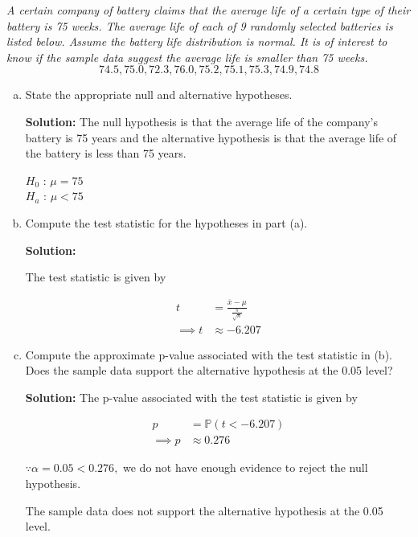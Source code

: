 \documentclass[12pt,letterpaper]{article}
\begin{document}
\textit{A certain company of battery claims that the average life of a certain type of their battery is 75 weeks. The average life of each of 9 randomly selected batteries is listed below. Assume the battery life distribution is normal. It is of interest to know if the sample data suggest the average life is smaller than 75 weeks.}
$$74.5, 75.0, 72.3, 76.0, 75.2, 75.1, 75.3, 74.9, 74.8$$

\begin{enumerate}[a.] \setlength{\itemsep}{30pt}
  \item State the appropriate null and alternative hypotheses.
  
  \textbf{Solution:}
  The null hypothesis is that the average life of the company's battery is 75 years and the alternative hypothesis is that the average life of the battery is less than 75 years.
  
  $H_0$ : $\mu = 75$\\
  $H_a$ : $\mu < 75$

  \item Compute the test statistic for the hypotheses in part (a).

  \textbf{Solution:}

  The test statistic is given by

  \begin{equation}
    \begin{split}
      t &= \frac{\overline{x} - \mu}{\frac{s}{\sqrt{n}}}\\
      \implies t &\approx -6.207
    \end{split}
  \end{equation}
  \item Compute the approximate p-value associated with the test statistic in (b). Does the sample data support the alternative hypothesis at the 0.05 level?

  \textbf{Solution:}
  The p-value associated with the test statistic is given by

  \begin{equation}
    \begin{split}
      p &= \mathbb{P}(t < -6.207)\\
      \implies p &\approx 0.276
    \end{split}
  \end{equation}

  $\because \alpha = 0.05 < 0.276,$ we do not have enough evidence to reject the null hypothesis.

  The sample data does not support the alternative hypothesis at the 0.05 level.
  \end{enumerate}
\newpage

\end{document}
